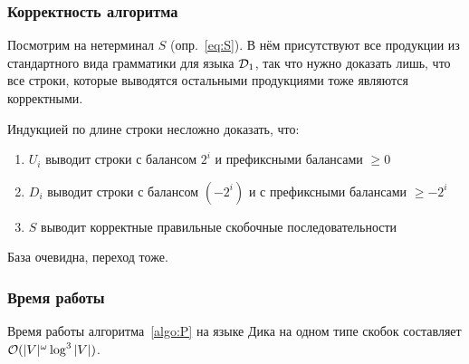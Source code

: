 \subsubsection{Корректность алгоритма}

Посмотрим на нетерминал $S$ (опр.~\ref{eq:S}). В нём присутствуют все продукции из стандартного вида грамматики для языка $\mathcal{D}_1$, так что нужно доказать лишь, что все строки, которые выводятся остальными продукциями тоже являются корректными. 

Индукцией по длине строки несложно доказать, что:

\vspace{-\topsep}
\begin{enumerate}
  \setlength\itemsep{-0.1em}
  \item $U_i$ выводит строки с балансом $2^{i}$ и префиксными балансами $\ge 0$
  \item $D_i$ выводит строки с балансом $(-2^{i})$ и с префиксными балансами $\ge -2^{i}$
  \item $S$ выводит корректные правильные скобочные последовательности
\end{enumerate}

База очевидна, переход тоже.

\subsubsection{Время работы}

\begin{theorem}\label{thm:dyck_1}
  Время работы алгоритма~\ref{algo:P} на языке Дика на одном типе скобок составляет $\mathcal{O}(|V|^{\omega} \log^3 |V|)$.
\end{theorem}


